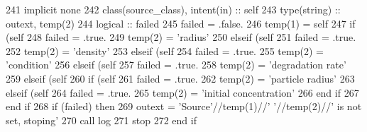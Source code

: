 \begin{DoxyCode}
241     \textcolor{keywordtype}{implicit none}
242     \textcolor{keywordtype}{class}(source\_class), \textcolor{keywordtype}{intent(in)} :: self
243     \textcolor{keywordtype}{type}(string) :: outext, temp(2)
244     \textcolor{keywordtype}{logical} :: failed
245     failed = .false.
246     temp(1) = self%
247     \textcolor{keywordflow}{if} (self%
248         failed = .true.
249         temp(2) = \textcolor{stringliteral}{'radius'}
250     \textcolor{keywordflow}{elseif} (self%
251         failed = .true.
252         temp(2) = \textcolor{stringliteral}{'density'}
253     \textcolor{keywordflow}{elseif} (self%
254         failed = .true.
255         temp(2) = \textcolor{stringliteral}{'condition'}
256     \textcolor{keywordflow}{elseif} (self%
257         failed = .true.
258         temp(2) = \textcolor{stringliteral}{'degradation rate'}
259     \textcolor{keywordflow}{elseif} (self%
260         \textcolor{keywordflow}{if} (self%
261             failed = .true.
262             temp(2) = \textcolor{stringliteral}{'particle radius'}
263         \textcolor{keywordflow}{elseif} (self%
264             failed = .true.
265             temp(2) = \textcolor{stringliteral}{'initial concentration'}
266 \textcolor{keywordflow}{        end if}
267 \textcolor{keywordflow}{    end if}
268     \textcolor{keywordflow}{if} (failed) \textcolor{keywordflow}{then}
269         outext = \textcolor{stringliteral}{'Source'}//temp(1)//\textcolor{stringliteral}{' '}//temp(2)//\textcolor{stringliteral}{' is not set, stoping'}
270         \textcolor{keyword}{call }log%
271         stop
272 \textcolor{keywordflow}{    end if}
\end{DoxyCode}
\mbox{\label{namespacesources__mod_a6dcf7a3e3ccf75e01853df166231d484}} 
